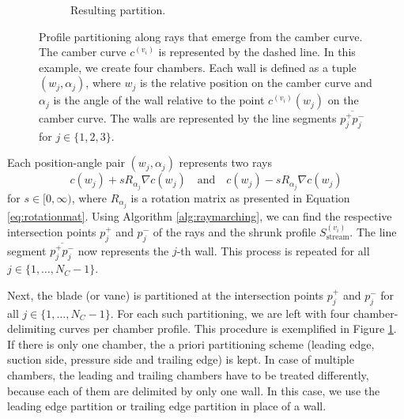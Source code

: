 \documentclass[a4paper, 11pt]{report}
\theoremstyle{definition}
\begin{document}
\begin{figure}[H]
\begin{subfigure}{.33\textwidth}
			\vspace{2cm}
			\caption{Resulting partition.}
		\end{subfigure}
		\caption{Profile partitioning along rays that emerge from the camber curve. The camber curve $c^{(v_i)}$ is represented by the dashed line. In this example, we create four chambers. Each wall is defined as a tuple $(w_j, \alpha_j)$, where $w_j$ is the relative position on the camber curve and $\alpha_j$ is the angle of the wall relative to the point $c^{(v_i)}(w_j)$ on the camber curve. The walls are represented by the line segments $\overline{p_j^+p_j^-}$ for $j \in \{1, 2, 3\}$.}
		\label{fig:subdivision_chamber}
	\end{figure}

	Each position-angle pair $(w_j, \alpha_j)$ represents two rays
		$$ c(w_j) + sR_{\alpha_j} \nabla c(w_j) \quad\text{and}\quad c(w_j) - sR_{\alpha_j} \nabla c(w_j) $$
	for $s \in [0, \infty)$, where $R_{\alpha_j}$ is a rotation matrix as presented in Equation \ref{eq:rotationmat}. Using Algorithm \ref{alg:raymarching}, we can find the respective intersection points $p_j^+$ and $p_j^-$ of the rays and the shrunk profile $S^{(v_i)}_\textrm{stream}$. The line segment $\overline{p_j^+p_j^-}$ now represents the $j$-th wall. This process is repeated for all $j \in \{1,\ldots,N_C-1\}$.

	Next, the blade (or vane) is partitioned at the intersection points $p_j^+$ and $p_j^-$ for all $j \in \{1,\ldots,N_C-1\}$. For each such partitioning, we are left with four chamber-delimiting curves per chamber profile. This procedure is exemplified in Figure \ref{fig:subdivision_chamber}. If there is only one chamber, the a priori partitioning scheme (leading edge, suction side, pressure side and trailing edge) is kept. In case of multiple chambers, the leading and trailing chambers have to be treated differently, because each of them are delimited by only one wall. In this case, we use the leading edge partition or trailing edge partition in place of a wall.
\end{document}
